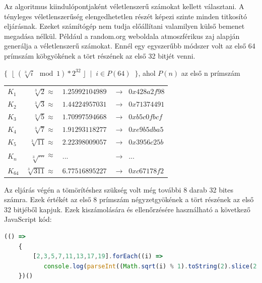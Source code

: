 \bigbreak


Az algoritmus kiindulópontjaként véletlenszerű számokat kellett választani. A tényleges véletlenszerűség elengedhetetlen részét képezi szinte minden titkosító eljárásnak. Ezeket számítógép nem tudja előállítani valamilyen külső bemenet megadása nélkül. Például a random.org weboldala atmoszférikus zaj alapján generálja a véletlenszerű számokat. Ennél egy egyszerűbb módszer volt az első 64 prímszám köbgyökének a tört részének az első 32 bitjét venni.


\bigbreak


{\hfil $ \{ \;\; \lfloor \; (\sqrt[3]{i} \mod 1) * 2^{32} \; \rfloor \;\; | \;\; i \in P(64) \;\; \}  $, ahol $P(n)$ az első n prímszám \par}


\bigbreak


\begin{tabular}{lrll}

    $K_1$     &  $\sqrt[3]{2}   \approx$  & $1.25992104989$  &  $\xrightarrow{} \;\; 0x428a2f98$ \\
    $K_2$     &  $\sqrt[3]{3}   \approx$  & $1.44224957031$  &  $\xrightarrow{} \;\; 0x71374491$ \\
    $K_3$     &  $\sqrt[3]{5}   \approx$  & $1.70997594668$  &  $\xrightarrow{} \;\; 0xb5c0fbcf$ \\
    $K_4$     &  $\sqrt[3]{7}   \approx$  & $1.91293118277$  &  $\xrightarrow{} \;\; 0xe9b5dba5$ \\
    $K_5$     &  $\sqrt[3]{11}  \approx$  & $2.22398009057$  &  $\xrightarrow{} \;\; 0x3956c25b$ \\
    $K_n$     &  $\sqrt[3]{...} \approx$  & $...$            &  $\xrightarrow{} \;\; ...$ \\
    $K_{64}$  &  $\sqrt[3]{311} \approx$  & $6.77516895227$  &  $\xrightarrow{} \;\; 0xc67178f2$ \\

\end{tabular}


\bigbreak


Az eljárás végén a tömörítéshez szükség volt még további 8 darab 32 bites számra. Ezek értékét az első 8 prímszám négyzetgyökének a tört részének az első 32 bitjéből kapjuk. Ezek kiszámolására és ellenőrzésére használható a következő JavaScript kód:

\begin{algorithm}
    \begin{lstlisting}[language={JavaScript}]
    (() =>
    {
        [2,3,5,7,11,13,17,19].forEach((i) =>
           console.log(parseInt((Math.sqrt(i) % 1).toString(2).slice(2, 34), 2).toString(16)))
    })()
    \end{lstlisting}
\end{algorithm}

